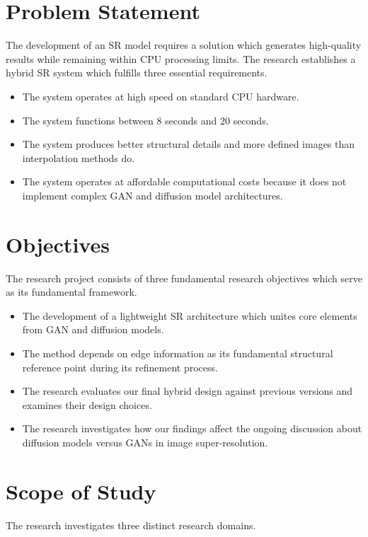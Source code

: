 \documentclass[conference]{IEEEtran}
\begin{document}
\section{Problem Statement}
The development of an SR model requires a solution which generates high-quality results while remaining within CPU processing limits. The research establishes a hybrid SR system which fulfills three essential requirements.

\begin{itemize}
    \item The system operates at high speed on standard CPU hardware.
    \item The system functions between 8 seconds and 20 seconds.
    \item The system produces better structural details and more defined images than interpolation methods do.
    \item The system operates at affordable computational costs because it does not implement complex GAN and diffusion model architectures.
\end{itemize}

\section{Objectives}
The research project consists of three fundamental research objectives which serve as its fundamental framework.

\begin{itemize}
    \item The development of a lightweight SR architecture which unites core elements from GAN and diffusion models.
    \item The method depends on edge information as its fundamental structural reference point during its refinement process.
    \item The research evaluates our final hybrid design against previous versions and examines their design choices.
    \item The research investigates how our findings affect the ongoing discussion about diffusion models versus GANs in image super-resolution.
\end{itemize}

\section{Scope of Study}
The research investigates three distinct research domains.
\end{document}
